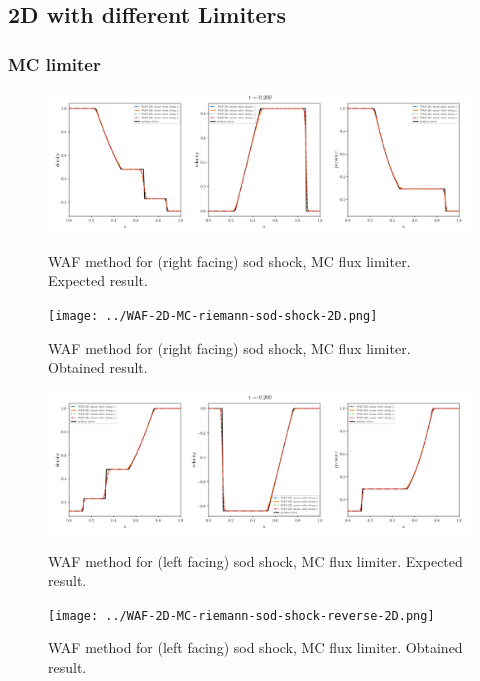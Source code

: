 \subsection{2D with different Limiters}




\clearpage
\subsubsection{MC limiter}

    \begin{figure}[htbp]
        \centering
        \includegraphics[width=.9\textwidth]{./figures/WAF-2D-MC-riemann-sod-shock-2D.png}%
        \caption{WAF method for (right facing) sod shock, MC flux limiter. Expected result.}
        \texttt{[image: ../WAF-2D-MC-riemann-sod-shock-2D.png]}%
        \caption{WAF method for (right facing) sod shock, MC flux limiter. Obtained result.}
    \end{figure}


    \begin{figure}[htbp]
        \centering
        \includegraphics[width=.9\textwidth]{./figures/WAF-2D-MC-riemann-sod-shock-reverse-2D.png}%
        \caption{WAF method for (left facing) sod shock, MC flux limiter. Expected result.}
        \texttt{[image: ../WAF-2D-MC-riemann-sod-shock-reverse-2D.png]}%
        \caption{WAF method for (left facing) sod shock, MC flux limiter. Obtained result.}
    \end{figure}







